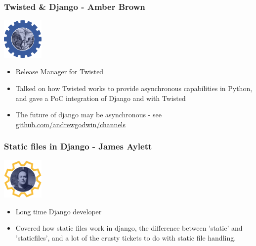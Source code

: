\documentclass{beamer}
\begin{document}
\begin{frame}[fragile]\frametitle{Twisted \& Django - Amber Brown}

    \begin{center}
        \includegraphics[width=2cm]{speaker-amber}
    \end{center}

    \begin{itemize}
        \item Release Manager for Twisted
        \item Talked on how Twisted works to provide asynchronous capabilities in Python, and gave a PoC integration of Django and with Twisted
        \item The future of django may be asynchronous - see \url{github.com/andrewgodwin/channels}
    \end{itemize}

\end{frame}


\begin{frame}[fragile]\frametitle{Static files in Django - James Aylett}

    \begin{center}
        \includegraphics[width=2cm]{speaker-james}
    \end{center}

    \begin{itemize}
        \item Long time Django developer
        \item Covered how static files work in django, the difference between 'static' and 'staticfiles', and a lot of the crusty tickets to do with static file handling.
    \end{itemize}

\end{frame}
\end{document}
